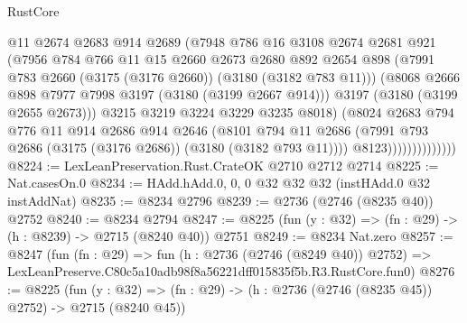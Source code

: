\begin{lexlean}{RustCore}
\begin{coremodule}
                              @11
                              @2674
                              @2683
                              @914
                              @2689
                              (@7948
                                @786
                                @16
                                @3108
                                @2674
                                @2681
                                @921
                                (@7956
                                  @784
                                  @766
                                  @11
                                  @15
                                  @2660
                                  @2673
                                  @2680
                                  @892
                                  @2654
                                  @898
                                  (@7991 @783 @2660 (@3175 (@3176 @2660)) (@3180 (@3182 @783 @11)))
                                  (@8068 @2666 @898 @7977 @7998 @3197 (@3180 (@3199 @2667 @914)))
                                  @3197
                                  (@3180 (@3199 @2655 @2673)))
                                @3215
                                @3219
                                @3224
                                @3229
                                @3235
                                @8018)
                              (@8024
                                @2683
                                @794
                                @776
                                @11
                                @914
                                @2686
                                @914
                                @2646
                                (@8101
                                  @794
                                  @11
                                  @2686
                                  (@7991 @793 @2686 (@3175 (@3176 @2686)) (@3180 (@3182 @793 @11))))
                                @8123))))))))))))))
@8224 := LexLeanPreservation.Rust.CrateOK @2710 @2712 @2714
@8225 := Nat.casesOn.{0}
@8234 := HAdd.hAdd.{0, 0, 0} @32 @32 @32 (instHAdd.{0} @32 instAddNat)
@8235 := @8234 @2796
@8239 := @2736 (@2746 (@8235 @40)) @2752
@8240 := @8234 @2794
@8247 := @8225 (fun (y : @32) => (fn : @29) -> (h : @8239) -> @2715 (@8240 @40)) @2751
@8249 := @8234 Nat.zero
@8257 := @8247
    (fun (fn : @29) =>
    fun (h : @2736 (@2746 (@8249 @40)) @2752) =>
    LexLeanPreserve.C80c5a10adb98f8a56221dff015835f5b.R3.RustCore.fun0)
@8276 := @8225
    (fun (y : @32) => (fn : @29) -> (h : @2736 (@2746 (@8235 @45)) @2752) -> @2715 (@8240 @45))

\end{coremodule}
\end{lexlean}

